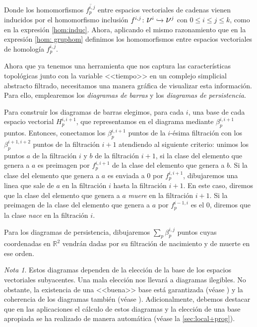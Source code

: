 \documentclass[12pt, a4paper, twoside]{book}
\numberwithin{equation}{section}
\theoremstyle{definition}
\theoremstyle{remark}
\newtheorem*{remark}{Nota}
\theoremstyle{plain}
\begin{document}
	Donde los homomorfismos $\overline{f_{p}^{i,j}}$ entre espacios 
	vectoriales de 
	cadenas vienen inducidos por el homomorfismo inclusión $f^{i,j}\colon 
	\text{{\Large $\nu$}$^{i}$} \xhookrightarrow{} 
	\text{{\Large $\nu$}$^{j}$}$ con $0\leq i \leq j \leq k$, como en la 
	expresión
	\ref{hom:induc}. Ahora, aplicando el mismo razonamiento que en la 
	expresión 
	\ref{hom: gruphom} definimos los homomorfismos entre espacios 
	vectoriales de 
	homología $f^{i,j}_{p}$.

	Ahora que ya tenemos una herramienta que nos captura las 
	características topológicas junto con la variable <<tiempo>> en un 
	complejo simplicial abstracto filtrado, necesitamos una manera gráfica 
	de visualizar esta información. Para ello, emplearemos los  
	\emph{diagramas de barras} y los \emph{diagramas de persistencia}.
	
	Para construir los diagramas de barras elegimos, para cada $i$, una 
	base de cada espacio vectorial $H_{p}^{i,i+1}$, que representamos en el 
	diagrama mediante $\beta_{p}^{i,i+1}$ puntos. Entonces, conectamos los
	$\beta_{p}^{i,i+1}$ puntos de la $i$-ésima filtración con los 
	$\beta_{p}^{i+1,i+2}$ puntos de la filtración $i+1$ atendiendo al 
	siguiente criterio: unimos los puntos $a$ de la filtración $i$ y $b$ de
	la filtración $i+1$, si la clase del elemento que genera a $a$ es 
	preimagen por $f_{p}^{i,i+1}$ de la clase del elemento que genera a 
	$b$. Si la clase del elemento que genera a $a$ es enviada a 0 por 
	$f_{p}^{i,i+1}$, dibujaremos una linea que sale de $a$ en la filtración
	$i$ hasta la filtración $i+1$. En este caso, diremos que la clase del 
	elemento que genera a $a$ \emph{muere} en la filtración $i+1$. Si la 
	preimagen de la clase del elemento que genera a $a$ por 
	$f_{p}^{i-1,i}$ es el 0, diremos que la clase \emph{nace} en la 
	filtración $i$.

	Para los diagramas de persistencia, dibujaremos $\sum_{p}
	\beta_{p}^{i,j}$ puntos cuyas coordenadas en $\mathbb{R}^{2}$ vendrán 
	dadas por su filtración de nacimiento y de muerte en ese orden. 

	\begin{remark}
		Estos diagramas dependen de la elección de la base de los 
		espacios vectoriales subyacentes. Una mala elección nos 
		llevará a diagramas ilegibles. No obstante, la existencia de 
		una <<buena>> base está garantizada (véase 
		\cite{BaseDiagExt-Carlsson}) y la 
		coherencia de los diagramas también (véase 
		\cite{BaseDiag-Cavanna}). Adicionalmente, debemos destacar que
		en las aplicaciones el cálculo de estos diagramas y la 
		elección de una base apropiada se ha 
		realizado de manera automática (véase la
		\autoref{sec:local+prog}). 
	\end{remark}
\end{document}
